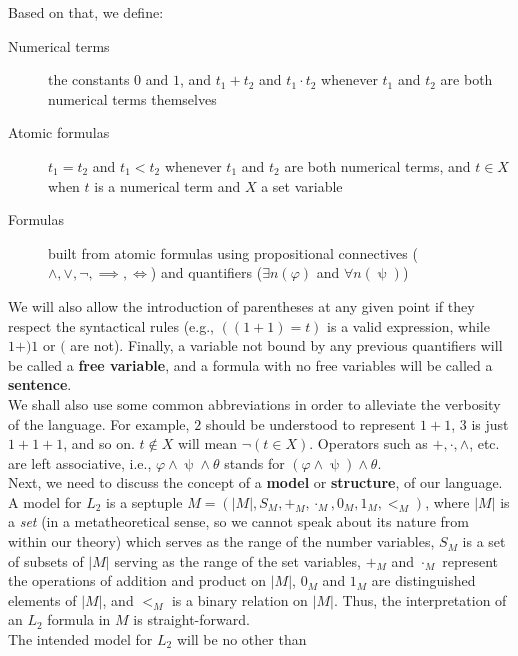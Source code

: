 \documentclass[../main.tex]{memoir}
\begin{document}
Based on that, we define:

\begin{description}
    \item[Numerical terms] the constants $0$ and $1$, and $t_1 + t_2$ and $t_1 \cdot t_2$ whenever $t_1$ and $t_2$ are both numerical terms themselves
    \item[Atomic formulas] $t_1 = t_2$ and $t_1 < t_2$ whenever $t_1$ and $t_2$ are both numerical terms, and $t \in X$ when $t$ is a numerical term and $X$ a set variable
    \item[Formulas] built from atomic formulas using propositional connectives ($\land, \lor, \neg, \implies, \iff$) and quantifiers ($\exists n (\varphi)$ and $\forall n (\uppsi)$)
\end{description}

We will also allow the introduction of parentheses at any given point if they respect the syntactical rules (e.g., $((1 + 1) = t)$ is a valid expression, while $1 + ) 1$ or $($ are not). Finally, a variable not bound by any previous quantifiers will be called a \textbf{free variable}, and a formula with no free variables will be called a \textbf{sentence}. \\

We shall also use some common abbreviations in order to alleviate the verbosity of the language. For example, $2$ should be understood to represent $1 + 1$, $3$ is just $1 + 1 + 1$, and so on. $t \not\in X$ will mean $\neg(t \in X)$. Operators such as $+, \cdot, \land$, etc. are left associative, i.e., $\varphi \land \uppsi \land \theta$ stands for $(\varphi \land \uppsi) \land \theta$. \\

Next, we need to discuss the concept of a \textbf{model} or \textbf{structure}, of our language. A model for $L_2$ is a septuple $M = (|M|, S_M, +_M, \cdot_M, 0_M, 1_M, <_M)$, where $|M|$ is a \textit{set} (in a metatheoretical sense, so we cannot speak about its nature from within our theory) which serves as the range of the number variables, $S_M$ is a set of subsets of $|M|$ serving as the range of the set variables, $+_M$ and $\cdot_M$ represent the operations of addition and product on $|M|$, $0_M$ and $1_M$ are distinguished elements of $|M|$, and $<_M$ is a binary relation on $|M|$. Thus, the interpretation of an $L_2$ formula in $M$ is straight-forward. \\

The intended model for $L_2$ will be no other than
\end{document}
